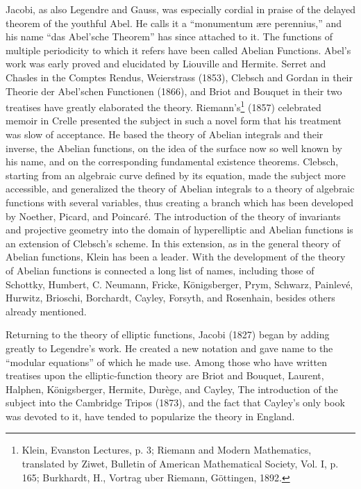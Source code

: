 \documentclass[oneside]{book}
\begin{document}
Jacobi, as also Legendre and Gauss, was especially cordial in praise
of the delayed theorem of the youthful Abel. He calls it a
``monumentum \ae{}re perennius,'' and his name ``das Abel'sche
Theorem'' has since attached to it. The functions of multiple
periodicity to which it refers have been called Abelian
Functions. Abel's work was early proved and elucidated by Liouville
and Hermite. Serret and Chasles in the Comptes Rendus, Weierstrass
(1853), Clebsch and Gordan in their Theorie der Abel'schen
Functionen (1866), and Briot and Bouquet in their two treatises have
greatly elaborated the theory. Riemann's\footnote{Klein, Evanston
Lectures, p. 3; Riemann and Modern Mathematics, translated by
Ziwet, Bulletin of American Mathematical Society, Vol. I, p. 165;
Burkhardt, H., Vortrag uber Riemann, G\"ottingen, 1892.} (1857)
celebrated memoir in Crelle presented the subject in such a novel
form that his treatment was slow of acceptance. He based the theory
of Abelian integrals and their inverse, the Abelian functions, on
the idea of the surface now so well known by his name, and on the
corresponding fundamental existence theorems. Clebsch, starting from
an algebraic curve defined by its equation, made the subject more
accessible, and generalized the theory of Abelian integrals to a
theory of algebraic functions with several variables, thus creating
a branch which has been developed by Noether, Picard, and
Poincar\'e. The introduction of the theory of invariants and
projective geometry into the domain of hyperelliptic and Abelian
functions is an extension of Clebsch's scheme. In this extension, as
in the general theory of Abelian functions, Klein has been a
leader. With the development of the theory of Abelian functions is
connected a long list of names, including those of Schottky,
Humbert, C. Neumann, Fricke, K\"onigsberger, Prym, Schwarz,
Painlev\'e, Hurwitz, Brioschi, Borchardt, Cayley, Forsyth, and
Rosenhain, besides others already mentioned.

Returning to the theory of elliptic functions, Jacobi (1827) began
by adding greatly to Legendre's work. He created a new notation and
gave name to the ``modular equations'' of which he made use. Among
those who have written treatises upon the elliptic-function theory
are Briot and Bouquet, Laurent, Halphen, K\"onigsberger, Hermite,
Dur\`ege, and Cayley, The introduction of the subject into the
Cambridge Tripos (1873), and the fact that Cayley's only book was
devoted to it, have tended to popularize the theory in England.
\end{document}

